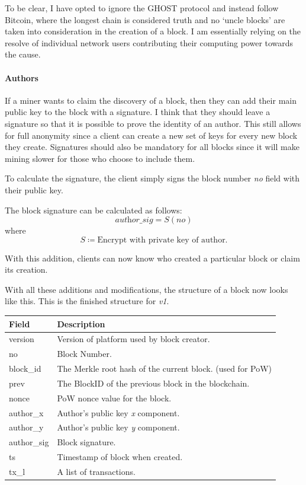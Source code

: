 \documentclass{article}
\begin{document}
To be clear, I have opted to ignore the GHOST protocol and instead follow Bitcoin, where the longest chain is considered truth and no `uncle blocks' are taken into consideration in the creation of a block. I am essentially relying on the resolve of individual network users contributing their computing power towards the cause.

\paragraph{Authors}
If a miner wants to claim the discovery of a block, then they can add their main public key to the block with a signature. I think that they should leave a signature so that it is possible to prove the identity of an author. This still allows for full anonymity since a client can create a new set of keys for every new block they create. Signatures should also be mandatory for all blocks since it will make mining slower for those who choose to include them.

To calculate the signature, the client simply signs the block number \textit{no} field with their public key.



The block signature can be calculated as follows:
\[\textit{author\_sig} = S(\textit{no})\]
where
\[S \coloneqq \textrm{Encrypt with private key of author.}\]

With this addition, clients can now know who created a particular block or claim its creation.

\newpage

With all these additions and modifications, the structure of a block now looks like this. This is the finished structure for \textit{v1}.
\begin{table}[H]
\centering
\begin{tabular}{|p{2.5cm}|p{8.5cm}|}
\hline
\rowcolor{tblgrey} 
Field      & Description                                         \\ \hline
version    & Version of platform used by block creator.          \\ \hline
no         & Block Number.                                       \\ \hline
block\_id  & The Merkle root hash of the current block. (used for PoW)  \\ \hline
prev       & The BlockID of the previous block in the blockchain.   \\ \hline
nonce      & PoW nonce value for the block.                      \\ \hline
author\_x  & Author's public key \textit{x} component.           \\ \hline
author\_y  & Author's public key \textit{y} component.           \\ \hline
author\_sig& Block signature.                                    \\ \hline
ts         & Timestamp of block when created.                    \\ \hline
tx\_l      & A list of transactions.                            \\ \hline
\end{tabular}
\end{table}
\end{document}
